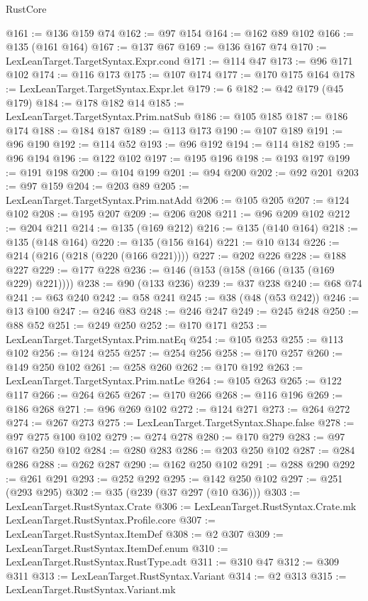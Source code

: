\begin{lexlean}{RustCore}
\begin{coremodule}
@161 := @136 @159 @74
@162 := @97 @154
@164 := @162 @89 @102
@166 := @135 (@161 @164)
@167 := @137 @67
@169 := @136 @167 @74
@170 := LexLeanTarget.TargetSyntax.Expr.cond
@171 := @114 @47
@173 := @96 @171 @102
@174 := @116 @173
@175 := @107 @174
@177 := @170 @175 @164
@178 := LexLeanTarget.TargetSyntax.Expr.let
@179 := 6
@182 := @42 @179 (@45 @179)
@184 := @178 @182 @14
@185 := LexLeanTarget.TargetSyntax.Prim.natSub
@186 := @105 @185
@187 := @186 @174
@188 := @184 @187
@189 := @113 @173
@190 := @107 @189
@191 := @96 @190
@192 := @114 @52
@193 := @96 @192
@194 := @114 @182
@195 := @96 @194
@196 := @122 @102
@197 := @195 @196
@198 := @193 @197
@199 := @191 @198
@200 := @104 @199
@201 := @94 @200
@202 := @92 @201
@203 := @97 @159
@204 := @203 @89
@205 := LexLeanTarget.TargetSyntax.Prim.natAdd
@206 := @105 @205
@207 := @124 @102
@208 := @195 @207
@209 := @206 @208
@211 := @96 @209 @102
@212 := @204 @211
@214 := @135 (@169 @212)
@216 := @135 (@140 @164)
@218 := @135 (@148 @164)
@220 := @135 (@156 @164)
@221 := @10 @134
@226 := @214 (@216 (@218 (@220 (@166 @221))))
@227 := @202 @226
@228 := @188 @227
@229 := @177 @228
@236 := @146 (@153 (@158 (@166 (@135 (@169 @229) @221))))
@238 := @90 (@133 @236)
@239 := @37 @238
@240 := @68 @74
@241 := @63 @240
@242 := @58 @241
@245 := @38 (@48 (@53 @242))
@246 := @13 @100
@247 := @246 @83
@248 := @246 @247
@249 := @245 @248
@250 := @88 @52
@251 := @249 @250
@252 := @170 @171
@253 := LexLeanTarget.TargetSyntax.Prim.natEq
@254 := @105 @253
@255 := @113 @102
@256 := @124 @255
@257 := @254 @256
@258 := @170 @257
@260 := @149 @250 @102
@261 := @258 @260
@262 := @170 @192
@263 := LexLeanTarget.TargetSyntax.Prim.natLe
@264 := @105 @263
@265 := @122 @117
@266 := @264 @265
@267 := @170 @266
@268 := @116 @196
@269 := @186 @268
@271 := @96 @269 @102
@272 := @124 @271
@273 := @264 @272
@274 := @267 @273
@275 := LexLeanTarget.TargetSyntax.Shape.false
@278 := @97 @275 @100 @102
@279 := @274 @278
@280 := @170 @279
@283 := @97 @167 @250 @102
@284 := @280 @283
@286 := @203 @250 @102
@287 := @284 @286
@288 := @262 @287
@290 := @162 @250 @102
@291 := @288 @290
@292 := @261 @291
@293 := @252 @292
@295 := @142 @250 @102
@297 := @251 (@293 @295)
@302 := @35 (@239 (@37 @297 (@10 @36)))
@303 := LexLeanTarget.RustSyntax.Crate
@306 := LexLeanTarget.RustSyntax.Crate.mk LexLeanTarget.RustSyntax.Profile.core
@307 := LexLeanTarget.RustSyntax.ItemDef
@308 := @2 @307
@309 := LexLeanTarget.RustSyntax.ItemDef.enum
@310 := LexLeanTarget.RustSyntax.RustType.adt
@311 := @310 @47
@312 := @309 @311
@313 := LexLeanTarget.RustSyntax.Variant
@314 := @2 @313
@315 := LexLeanTarget.RustSyntax.Variant.mk

\end{coremodule}
\end{lexlean}

